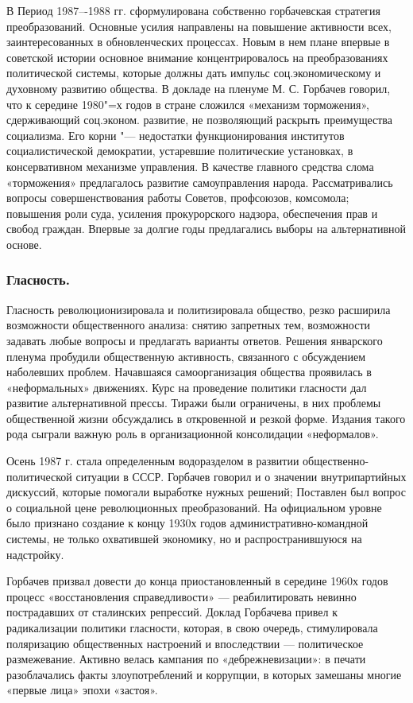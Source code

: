 В Период 1987–-1988 гг. сформулирована собственно горбачевская стратегия преобразований. Основные усилия направлены на повышение активности всех, заинтересованных в обновленческих процессах. Новым в нем плане впервые в советской истории основное внимание концентрировалось на преобразованиях политической системы, которые должны дать импульс соц.экономическому и духовному развитию общества. В докладе на пленуме М. С. Горбачев говорил, что к середине 1980"=х годов в стране сложился «механизм торможения», сдерживающий соц.эконом. развитие, не позволяющий раскрыть преимущества социализма. Его корни "--- недостатки функционирования институтов социалистической демократии, устаревшие политические установках, в консервативном механизме управления. В качестве главного средства слома «торможения» предлагалось развитие самоуправления народа. Рассматривались вопросы совершенствования работы Советов, профсоюзов, комсомола; повышения роли суда, усиления прокурорского надзора, обеспечения прав и свобод граждан. Впервые за долгие годы предлагались выборы на альтернативной основе.

\subsubsection{\textbf{Гласность.}}
Гласность революционизировала и политизировала общество, резко расширила возможности общественного анализа: снятию запретных тем, возможности задавать любые вопросы и предлагать варианты ответов.  Решения январского пленума пробудили общественную активность, связанного с обсуждением наболевших проблем. Начавшаяся самоорганизация общества проявилась в «неформальных» движениях. Курс на проведение политики гласности дал развитие альтернативной прессы. Тиражи были ограничены, в них проблемы общественной жизни обсуждались в откровенной и резкой форме. Издания такого рода сыграли важную роль в организационной консолидации «неформалов». 

Осень 1987 г. стала определенным водоразделом в развитии общественно-политической ситуации в СССР. Горбачев говорил и о значении внутрипартийных дискуссий, которые помогали выработке нужных решений; Поставлен был вопрос о социальной цене революционных преобразований. На официальном уровне было признано создание к концу 1930х годов административно-командной системы, не только охватившей экономику, но и распространившуюся на надстройку. 

Горбачев призвал довести до конца приостановленный в середине 1960х годов процесс «восстановления справедливости» — реабилитировать невинно пострадавших от сталинских репрессий. Доклад Горбачева привел к радикализации политики гласности, которая, в свою очередь, стимулировала поляризацию общественных настроений и впоследствии — политическое размежевание. Активно велась кампания по «дебрежневизации»: в печати разоблачались факты злоупотреблений и коррупции, в которых замешаны многие «первые лица» эпохи «застоя». 


